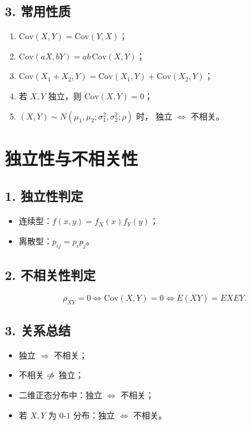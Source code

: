 \subsection*{3. 常用性质}
\begin{enumerate}
      \item $\mathrm{Cov}(X,Y)=\mathrm{Cov}(Y,X)$；
      \item $\mathrm{Cov}(aX,bY)=ab\,\mathrm{Cov}(X,Y)$；
      \item $\mathrm{Cov}(X_1+X_2,Y)=\mathrm{Cov}(X_1,Y)+\mathrm{Cov}(X_2,Y)$；
      \item 若 $X,Y$ 独立，则 $\mathrm{Cov}(X,Y)=0$；
      \item $(X,Y)\sim N(\mu_1,\mu_2;\sigma_1^2,\sigma_2^2;\rho)$ 时，
            独立 $\Leftrightarrow$ 不相关。
\end{enumerate}


\section{独立性与不相关性}

\subsection*{1. 独立性判定}
\begin{itemize}
      \item 连续型：$f(x,y)=f_X(x)f_Y(y)$；
      \item 离散型：$p_{ij}=p_i p_j$。
\end{itemize}

\subsection*{2. 不相关性判定}
$$\rho_{XY}=0\Leftrightarrow \mathrm{Cov}(X,Y)=0\Leftrightarrow E(XY)=EXEY.$$

\subsection*{3. 关系总结}
\begin{itemize}
      \item 独立 $\Rightarrow$ 不相关；
      \item 不相关 $\centernot\Rightarrow$ 独立；
      \item 二维正态分布中：独立 $\Leftrightarrow$ 不相关；
      \item 若 $X,Y$ 为 $0$-$1$ 分布：独立 $\Leftrightarrow$ 不相关。
\end{itemize}


